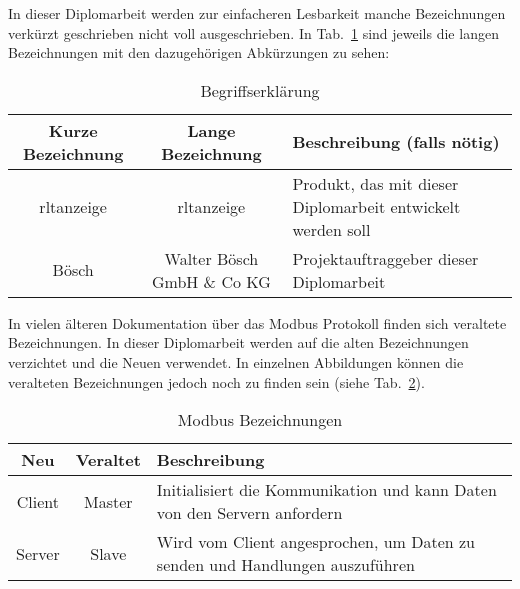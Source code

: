  \label{begriffserklaerung}

\noindent In dieser Diplomarbeit werden zur einfacheren Lesbarkeit manche Bezeichnungen verkürzt geschrieben \bzw nicht voll ausgeschrieben. In Tab.~\ref{tab:begriffserklaerung} sind jeweils die langen Bezeichnungen mit den dazugehörigen Abkürzungen zu sehen:
\begin{table}[h]
	\caption{Begriffserklärung \label{tab:begriffserklaerung}}
	\begin{tabularx}{\textwidth}{@{}c|c|X@{}}
		\toprule
		\textbf{Kurze Bezeichnung} & \textbf{Lange Bezeichnung} & \textbf{Beschreibung (falls nötig)} \\
		\midrule
		\acs{rltanzeige} & \acl{rltanzeige} &  Produkt, das mit dieser Diplomarbeit entwickelt werden soll \\
		Bösch & Walter Bösch GmbH \& Co KG & Projektauftraggeber dieser Diplomarbeit \\
		\bottomrule
	\end{tabularx}
\end{table}


In vielen älteren Dokumentation über das Modbus Protokoll finden sich veraltete Bezeichnungen. In dieser Diplomarbeit werden auf die alten Bezeichnungen verzichtet und die Neuen verwendet. In einzelnen Abbildungen können die veralteten Bezeichnungen jedoch noch zu finden sein (siehe Tab.~\ref{tab:modbus_bezeichnung}). 
\begin{table}[h]
	\caption{Modbus Bezeichnungen \label{tab:modbus_bezeichnung}}
	\begin{tabularx}{\textwidth}{@{}c|c|X@{}}
		\toprule
		\textbf{Neu} & \textbf{Veraltet} & \textbf{Beschreibung} \\
		\midrule
		Client & Master & Initialisiert die Kommunikation und kann Daten von den Servern anfordern \\
		Server & Slave & Wird vom Client angesprochen, um Daten zu senden und Handlungen auszuführen \\
		\bottomrule
	\end{tabularx}
\end{table}


